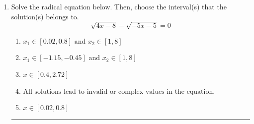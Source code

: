 \documentclass[14pt]{extbook}
\newcommand{\litem}[1]{\item#1\hspace*{-1cm}\rule{\textwidth}{0.4pt}}
\begin{document}
\begin{enumerate}
{\begin{enumerate}[label=\Alph*.]
\end{enumerate} }
\litem{
Solve the radical equation below. Then, choose the interval(s) that the solution(s) belongs to.\[ \sqrt{4 x - 8} - \sqrt{-5 x - 5} = 0 \]\begin{enumerate}[label=\Alph*.]
\item \( x_1 \in [0.02, 0.8] \text{ and } x_2 \in [1,8] \)
\item \( x_1 \in [-1.15, -0.45] \text{ and } x_2 \in [1,8] \)
\item \( x \in [0.4,2.72] \)
\item \( \text{All solutions lead to invalid or complex values in the equation.} \)
\item \( x \in [0.02,0.8] \)

\end{enumerate} }
\end{enumerate}
\end{document}
